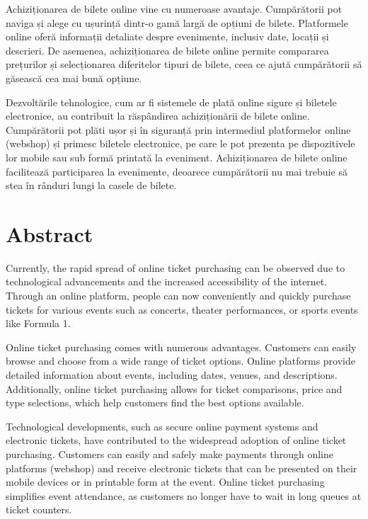 Achiziționarea de bilete online vine cu numeroase avantaje. Cumpărătorii pot naviga și alege cu ușurință dintr-o gamă largă de opțiuni de bilete. Platformele online oferă informații detaliate despre evenimente, inclusiv date, locații și descrieri. De asemenea, achiziționarea de bilete online permite compararea prețurilor și selecționarea diferitelor tipuri de bilete, ceea ce ajută cumpărătorii să găsească cea mai bună opțiune.

Dezvoltările tehnologice, cum ar fi sistemele de plată online sigure și biletele electronice, au contribuit la răspândirea achiziționării de bilete online. Cumpărătorii pot plăti ușor și în siguranță prin intermediul platformelor online (webshop) și primesc biletele electronice, pe care le pot prezenta pe dispozitivele lor mobile sau sub formă printată la eveniment. Achiziționarea de bilete online facilitează participarea la evenimente, deoarece cumpărătorii nu mai trebuie să stea în rânduri lungi la casele de bilete.


\vfill
{}

\chapter*{Abstract}

Currently, the rapid spread of online ticket purchasing can be observed due to technological advancements and the increased accessibility of the internet. Through an online platform, people can now conveniently and quickly purchase tickets for various events such as concerts, theater performances, or sports events like Formula 1.

Online ticket purchasing comes with numerous advantages. Customers can easily browse and choose from a wide range of ticket options. Online platforms provide detailed information about events, including dates, venues, and descriptions. Additionally, online ticket purchasing allows for ticket comparisons, price and type selections, which help customers find the best options available.

Technological developments, such as secure online payment systems and electronic tickets, have contributed to the widespread adoption of online ticket purchasing. Customers can easily and safely make payments through online platforms (webshop) and receive electronic tickets that can be presented on their mobile devices or in printable form at the event. Online ticket purchasing simplifies event attendance, as customers no longer have to wait in long queues at ticket counters.


\vfill
\dolgozatnyelve
{}